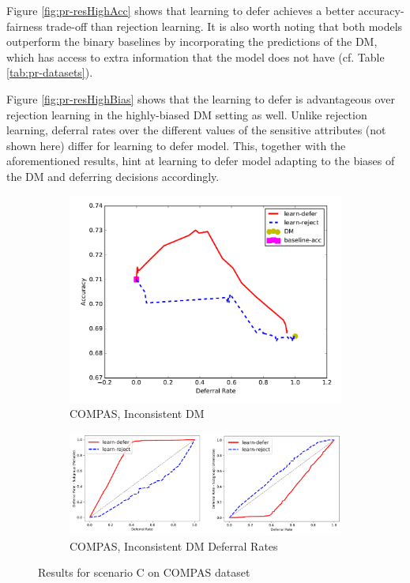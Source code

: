 \documentclass[11pt,a4paper,final]{article}
\begin{document}
Figure \ref{fig:pr-resHighAcc} shows that learning to defer achieves a better accuracy-fairness trade-off than rejection learning. It is also worth noting that both models outperform the binary baselines by incorporating the predictions of the DM, which has access to extra information that the model does not have (cf. Table \ref{tab:pr-datasets}).

Figure \ref{fig:pr-resHighBias} shows that the learning to defer is advantageous over rejection learning in the highly-biased DM setting as well. Unlike rejection learning, deferral rates over the different values of the sensitive attributes (not shown here) differ for learning to defer model. This, together with the aforementioned results, hint at learning to defer model adapting to the biases of the DM and deferring decisions accordingly.

\begin{figure}[ht]
\centering
\begin{subfigure}[t]{0.4\textwidth}
\includegraphics[width=\textwidth]{Figures/compasInconsistent.PNG}
\caption{COMPAS, Inconsistent DM}
\label{fig:pr-resIncons}
\end{subfigure}%
\begin{subfigure}[t]{0.6\textwidth}
\includegraphics[width=\textwidth]{Figures/compasDeferralRatesC.PNG}
\caption{COMPAS, Inconsistent DM Deferral Rates}
\label{fig:pr-resDeferC}
\end{subfigure}
\caption{Results for scenario C on COMPAS dataset}
\label{fig:pr-resC}
\end{figure}
\end{document}

